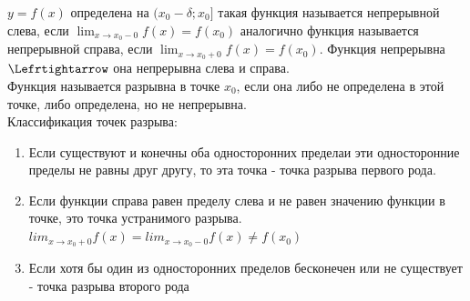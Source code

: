 \documentclass[oneside]{book}
\begin{document}
$y = f(x)$ определена на $(x_0 - \delta; x_0]$ такая функция называется непрерывной слева, если $\lim_{x \rightarrow x_0 - 0}{f(x)} = f(x_0)$
аналогично функция называется непрерывной справа, если $\lim_{x \rightarrow x_0 + 0}{f(x)} = f(x_0)$. Функция непрерывна $\Lefrtightarrow$ она непрерывна слева и справа. \\
Функция называется разрывна в точке $x_0$, если она либо не определена в этой точке, либо определена, но не непрерывна. \\
Классификация точек разрыва:
\begin{enumerate}
    \item Если существуют и конечны оба односторонних пределаи эти односторонние пределы не равны друг другу, то эта точка - точка разрыва
          первого рода.
    \item Если функции справа равен пределу слева и не равен значению функции в точке, это точка устранимого разрыва.
          $lim_{x \rightarrow x_0+0}{f(x)} = lim_{x \rightarrow x_0-0}{f(x)} \neq f(x_0)$
    \item Если хотя бы один из односторонних пределов бесконечен или не существует - точка разрыва второго рода
\end{enumerate}
\end{document}
